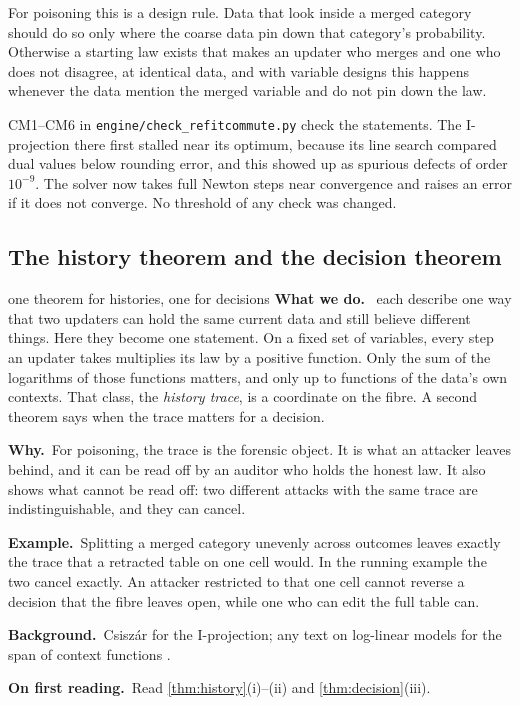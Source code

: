 \documentclass[11pt]{article}
\theoremstyle{definition}\newtheorem{definition}[theorem]{Definition}\newtheorem{remark}[theorem]{Remark}\newtheorem{example}[theorem]{Example}\newtheorem{problem}[theorem]{Open problem}\crefname{problem}{Problem}{Problems}
\newcommand{\rbwhat}{\textcolor{rbWhat}{\textbf{What we do.}}~}\newcommand{\rbwhy}{\par\smallskip\textcolor{rbWhy}{\textbf{Why.}}~}
\newcommand{\rbex}{\par\smallskip\textcolor{rbEx}{\textbf{Example.}}~}\newcommand{\rbbg}{\par\smallskip\textcolor{rbBg}{\textbf{Background.}}~}
\newcommand{\rbfirst}{\par\smallskip\textcolor{rbFirst}{\textbf{On first reading.}}~}
\begin{document}
For poisoning this is a design rule. Data that look inside a merged category should do so only where the coarse data pin down that category's probability. Otherwise a starting law exists that makes an updater who merges and one who does not disagree, at identical data, and with variable designs this happens whenever the data mention the merged variable and do not pin down the law.

CM1--CM6 in \texttt{engine/check\_refitcommute.py} check the statements. The I-projection there first stalled near its optimum, because its line search compared dual values below rounding error, and this showed up as spurious defects of order $10^{-9}$. The solver now takes full Newton steps near convergence and raises an error if it does not converge. No threshold of any check was changed.

\subsection{The history theorem and the decision theorem}\label{sec:historythm}
\begin{readerbox}{one theorem for histories, one for decisions}
\rbwhat {} each describe one way that two updaters can hold the same current data and still believe different things. Here they become one statement. On a fixed set of variables, every step an updater takes multiplies its law by a positive function. Only the sum of the logarithms of those functions matters, and only up to functions of the data's own contexts. That class, the \emph{history trace}, is a coordinate on the fibre. A second theorem says when the trace matters for a decision.
\rbwhy For poisoning, the trace is the forensic object. It is what an attacker leaves behind, and it can be read off by an auditor who holds the honest law. It also shows what cannot be read off: two different attacks with the same trace are indistinguishable, and they can cancel.
\rbex Splitting a merged category unevenly across outcomes leaves exactly the trace that a retracted table on one cell would. In the running example the two cancel exactly. An attacker restricted to that one cell cannot reverse a decision that the fibre leaves open, while one who can edit the full table can.
\rbbg Csisz\'ar \cite{Csiszar1975} for the I-projection; any text on log-linear models for the span of context functions \cite{DrtonSturmfelsSullivant2009}.
\rbfirst Read \cref{thm:history}(i)--(ii) and \cref{thm:decision}(iii).
\end{readerbox}
\end{document}
